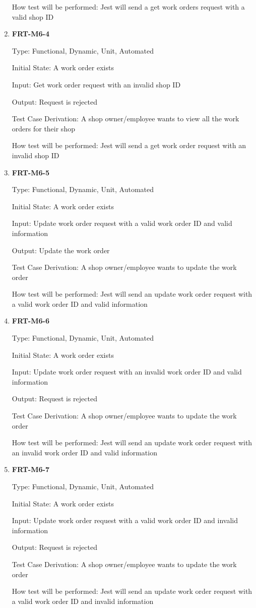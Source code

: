 \documentclass[12pt, titlepage]{article}
\begin{document}
\begin{enumerate}
	      How test will be performed: Jest will send a get work orders request with a valid shop ID

	\item \textbf{FRT-M6-4}

	      Type: Functional, Dynamic, Unit, Automated

	      Initial State: A work order exists

	      Input: Get work order request with an invalid shop ID

	      Output: Request is rejected

	      Test Case Derivation: A shop owner/employee wants to view all the work orders for their shop

	      How test will be performed: Jest will send a get work order request with an invalid shop ID

	\item \textbf{FRT-M6-5}

	      Type: Functional, Dynamic, Unit, Automated

	      Initial State: A work order exists

	      Input: Update work order request with a valid work order ID and valid information

	      Output: Update the work order

	      Test Case Derivation: A shop owner/employee wants to update the work order

	      How test will be performed: Jest will send an update work order request with a valid work order ID
	      and valid information

	\item \textbf{FRT-M6-6}

	      Type: Functional, Dynamic, Unit, Automated

	      Initial State: A work order exists

	      Input: Update work order request with an invalid work order ID and valid information

	      Output: Request is rejected

	      Test Case Derivation: A shop owner/employee wants to update the work order

	      How test will be performed: Jest will send an update work order request with an invalid work order
	      ID and valid information

	\item \textbf{FRT-M6-7}

	      Type: Functional, Dynamic, Unit, Automated

	      Initial State: A work order exists

	      Input: Update work order request with a valid work order ID and invalid information

	      Output: Request is rejected

	      Test Case Derivation: A shop owner/employee wants to update the work order

	      How test will be performed: Jest will send an update work order request with a valid work order ID
	      and invalid information

\end{enumerate}
\end{document}
